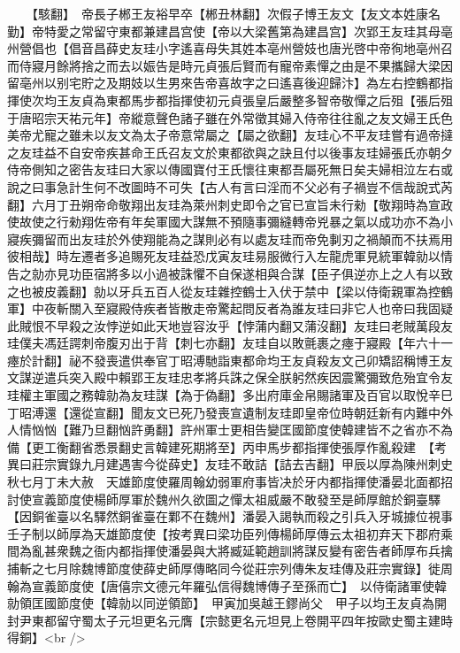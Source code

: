　　【駭翻】　帝長子郴王友裕早卒【郴丑林翻】次假子博王友文【友文本姓康名勤】帝特愛之常留守東都兼建昌宫使【帝以大梁舊第為建昌宫】次郢王友珪其母亳州營倡也【倡音昌薛史友珪小字遙喜母失其姓本亳州營妓也唐光啓中帝徇地亳州召而侍寢月餘將捨之而去以娠告是時元貞張后賢而有寵帝素憚之由是不果攜歸大梁因留亳州以别宅貯之及期妓以生男來告帝喜故字之曰遙喜後迎歸汴】為左右控鶴都指揮使次均王友貞為東都馬步都指揮使初元貞張皇后嚴整多智帝敬憚之后殂【張后殂于唐昭宗天祐元年】帝縱意聲色諸子雖在外常徵其婦入侍帝往往亂之友文婦王氏色美帝尤寵之雖未以友文為太子帝意常屬之【屬之欲翻】友珪心不平友珪嘗有過帝撻之友珪益不自安帝疾甚命王氏召友文於東都欲與之訣且付以後事友珪婦張氏亦朝夕侍帝側知之密告友珪曰大家以傳國寶付王氏懷往東都吾屬死無日矣夫婦相泣左右或說之曰事急計生何不改圖時不可失【古人有言曰淫而不父必有子禍豈不信哉說式芮翻】六月丁丑朔帝命敬翔出友珪為萊州刺史即令之官已宣旨未行勑【敬翔時為宣政使故使之行勑翔佐帝有年矣軍國大謀無不預隨事彌縫轉帝兇暴之氣以成功亦不為小寢疾彌留而出友珪於外使翔能為之謀則必有以處友珪而帝免剚刃之禍顛而不扶焉用彼相哉】時左遷者多追賜死友珪益恐戊寅友珪易服微行入左龍虎軍見統軍韓勍以情告之勍亦見功臣宿將多以小過被誅懼不自保遂相與合謀【臣子俱逆亦上之人有以致之也被皮義翻】勍以牙兵五百人從友珪雜控鶴士入伏于禁中【梁以侍衛親軍為控鶴軍】中夜斬關入至寢殿侍疾者皆散走帝驚起問反者為誰友珪曰非它人也帝曰我固疑此賊恨不早殺之汝悖逆如此天地豈容汝乎【悖蒲内翻又蒲沒翻】友珪曰老賊萬段友珪僕夫馮廷諤刺帝腹刃出于背【刺七亦翻】友珪自以敗氈裹之瘞于寢殿【年六十一瘞於計翻】祕不發喪遣供奉官丁昭溥馳詣東都命均王友貞殺友文己卯矯詔稱博王友文謀逆遣兵突入殿中賴郢王友珪忠孝將兵誅之保全朕躬然疾因震驚彌致危殆宜令友珪權主軍國之務韓勍為友珪謀【為于偽翻】多出府庫金帛賜諸軍及百官以取悅辛巳丁昭溥還【還從宣翻】聞友文已死乃發喪宣遺制友珪即皇帝位時朝廷新有内難中外人情忷忷【難乃旦翻忷許勇翻】許州軍士更相告變匡國節度使韓建皆不之省亦不為備【更工衡翻省悉景翻史言韓建死期將至】丙申馬步都指揮使張厚作亂殺建　【考異曰莊宗實錄九月建遇害今從薛史】友珪不敢詰【詰去吉翻】甲辰以厚為陳州刺史　秋七月丁未大赦　天雄節度使羅周翰幼弱軍府事皆决於牙内都指揮使潘晏北面都招討使宣義節度使楊師厚軍於魏州久欲圖之憚太祖威嚴不敢發至是師厚館於銅臺驛【因銅雀臺以名驛然銅雀臺在鄴不在魏州】潘晏入謁執而殺之引兵入牙城據位視事壬子制以師厚為天雄節度使【按考異曰梁功臣列傳楊師厚傳云太祖初弃天下郡府乘間為亂甚衆魏之衙内都指揮使潘晏與大將臧延範趙訓將謀反變有密告者師厚布兵擒捕斬之七月除魏博節度使薛史師厚傳略同今從莊宗列傳朱友珪傳及莊宗實錄】徙周翰為宣義節度使【唐僖宗文德元年羅弘信得魏博傳子至孫而亡】　以侍衛諸軍使韓勍領匡國節度使【韓勍以同逆領節】　甲寅加吳越王鏐尚父　甲子以均王友貞為開封尹東都留守蜀太子元坦更名元膺【宗懿更名元坦見上卷開平四年按歐史蜀主建時得銅】<br />
